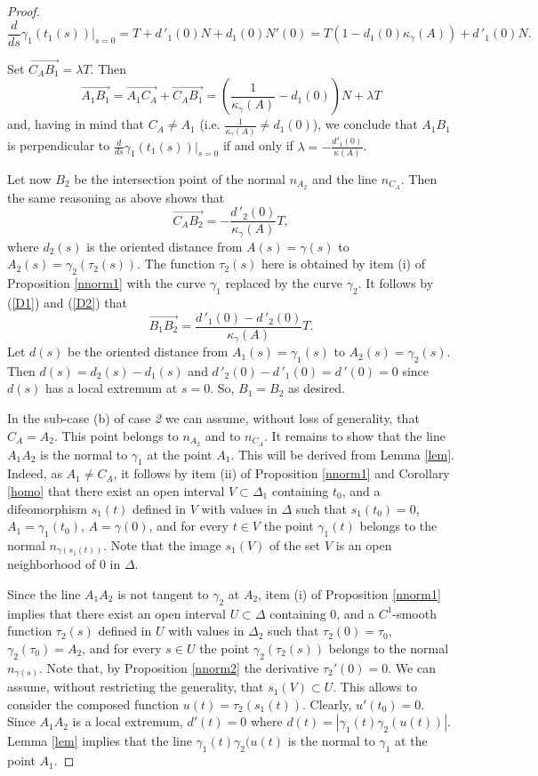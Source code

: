 \documentclass[a4paper,12pt]{amsart}
\def\g{\gamma}
\begin{document}
\begin{proof}
$$\frac{d}{ds}\g_1(t_1(s))|_{s=0}=
T+d\,'_1(0)N+d_1(0)N'(0)=T(1-d_1(0)\kappa_{\g}(A))+d\,'_1(0)N.$$

Set $\overrightarrow{C_AB_1} =\lambda T$. Then
$$ \overrightarrow{A_1B_1}= \overrightarrow{A_1C_A} +
\overrightarrow{C_AB_1}=
(\frac{1}{\kappa_{\g}(A)}-d_1(0))N+\lambda T$$ and, having in mind
that $C_A\neq A_1$ (i.e.
$\frac{1}{\kappa_{\g}(A)} \neq d_1(0)$), we conclude that $A_1B_1$ is perpendicular to
$\frac{d}{ds}\g_1(t_1(s))|_{s=0}$
if and only if $\lambda = -\frac{d'_1(0)}{\kappa(A)}$.

Let now $B_2$ be the intersection point of the normal $n_{A_2}$
and the line $n_{C_A}$. Then the same reasoning as above shows
that
\begin{equation}\label{D2}
\overrightarrow{C_AB_2} =-\frac{d\,'_2(0)}{\kappa_{\g}(A)}T ,
\end{equation}
where $d_2(s)$ is the oriented distance from $A(s)=\g(s)$ to
$A_2(s)=\g_2(\tau_2(s))$. The function
$\tau_2(s)$ here is obtained by item (i) of Proposition \ref{nnorm1} with the curve $\g_1$ replaced by the curve $\g_2$. It follows by (\ref{D1}) and (\ref{D2})
that
\begin{equation}\label{D3}
\overrightarrow{B_1B_2} =\frac{d\,'_1(0)-d\,'_2(0)}{\kappa_{\g}(A)}T.
\end{equation}
Let $d(s)$ be the oriented distance from $A_1(s)=\g_1(s)$ to
$A_2(s)=\g_2(s)$. Then $d(s)=d_2(s)-d_1(s)$ and
$d\,'_2(0)-d\,'_1(0)=d\,'(0)=0$ since $d(s)$ has a local extremum at
$s=0$. So, $B_1=B_2$ as desired.

In the sub-case (b) of case \emph{2} we can assume, without loss of generality, that $C_A= A_2$. This point belongs to
$n_{A_2}$ and to $n_{C_A}$. It remains to show that the line $A_1A_2$ is the normal to $\g_1$ at the point $A_1$. This will be derived from Lemma \ref{lem}. Indeed, as $A_1 \neq C_A$, it follows by item (ii) of Proposition \ref{nnorm1} and Corollary \ref{homo} that there exist an open interval
$V \subset \Delta_1$ containing $t_0$, and a  difeomorphism $s_1(t)$ defined in $V$ with values in
$\Delta$ such that $s_1(t_0) = 0$,
$A_1 =\g_1(t_0)$,
$A= \g(0)$, and for every
$t \in V$ the point $\g_1(t)$ belongs to the normal
 $n_{\g(s_1(t))}$. Note that the image $s_1(V)$ of the set $V$ is an open neighborhood of $0 $ in $\Delta$.

 Since the line $A_1A_2$ is not tangent to $\g_2$ at $A_2$, item (i) of Proposition \ref{nnorm1} implies that there exist an open interval $U \subset \Delta$ containing $0$, and a $C^1$-smooth function $\tau_2(s)$ defined in $ U$ with values in
$\Delta_2$ such that $\tau_2(0) = \tau_0$, $\g_2(\tau_0)=A_2$, and for every
$s \in U$ the point $\g_2(\tau_2(s))$ belongs to the normal $n_{\g(s)}$. Note that, by Proposition \ref{nnorm2} the derivative $\tau_2'(0) = 0$. We can assume, without restricting the generality, that
$s_1(V) \subset U$. This allows to consider the composed function $u(t) = \tau_2(s_1(t))$. Clearly, $u'(t_0) = 0$. Since $A_1A_2$ is a local extremum,
$d'(t)=0$ where $d(t)=|\g_1(t)\g_2(u(t))|$. Lemma \ref{lem} implies that the line $\g_1(t)\g_2(u(t)$ is the normal to $\g_1$ at the point $A_1$.



\end{proof}
\end{document}
